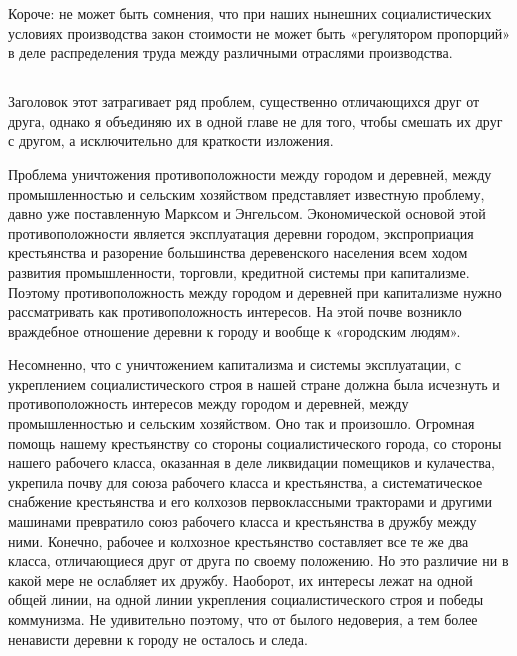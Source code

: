\documentclass[12pt, a4paper, openany]{book}
\begin{document}
Короче: не может быть сомнения, что при наших нынешних социалистических условиях производства закон стоимости не может быть «регулятором пропорций» в деле распределения труда между различными отраслями производства.



\vspace{0.4cm}



\subsection[4. Вопрос об уничтожении противоположности между городом и деревней, между умственным и физическим трудом, а также вопрос о ликвидации различий между ними]{}



Заголовок этот затрагивает ряд проблем, существенно отличающихся друг от друга, однако я объединяю их в одной главе не для того, чтобы смешать их друг с другом, а исключительно для краткости изложения.



Проблема уничтожения противоположности между городом и деревней, между промышленностью и сельским хозяйством представляет известную проблему, давно уже поставленную Марксом и Энгельсом. Экономической основой этой противоположности является эксплуатация деревни городом, экспроприация крестьянства и разорение большинства деревенского населения всем ходом развития промышленности, торговли, кредитной системы при капитализме. Поэтому противоположность между городом и деревней при капитализме нужно рассматривать как противоположность интересов. На этой почве возникло враждебное отношение деревни к городу и вообще к «городским людям».



Несомненно, что с уничтожением капитализма и системы эксплуатации, с укреплением социалистического строя в нашей стране должна была исчезнуть и противоположность интересов между городом и деревней, между промышленностью и сельским хозяйством. Оно так и произошло. Огромная помощь нашему крестьянству со стороны социалистического города, со стороны нашего рабочего класса, оказанная в деле ликвидации помещиков и кулачества, укрепила почву для союза рабочего класса и крестьянства, а систематическое снабжение крестьянства и его колхозов первоклассными тракторами и другими машинами превратило союз рабочего класса и крестьянства в дружбу между ними. Конечно, рабочее и колхозное крестьянство составляет все те же два класса, отличающиеся друг от друга по своему положению. Но это различие ни в какой мере не ослабляет их дружбу. Наоборот, их интересы лежат на одной общей линии, на одной линии укрепления социалистического строя и победы коммунизма. Не удивительно поэтому, что от былого недоверия, а тем более ненависти деревни к городу не осталось и следа.
\end{document}
